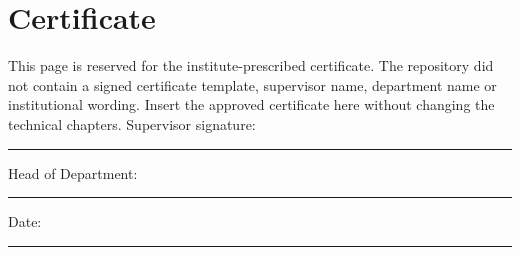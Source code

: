 \chapter*{Certificate}
This page is reserved for the institute-prescribed certificate. The repository did not contain a signed certificate template, supervisor name, department name or institutional wording. Insert the approved certificate here without changing the technical chapters.
\vspace{3cm}
Supervisor signature: \rule{7cm}{0.4pt}\par\vspace{1.2cm}
Head of Department: \rule{7cm}{0.4pt}\par\vspace{1.2cm}
Date: \rule{4cm}{0.4pt}
\clearpage
